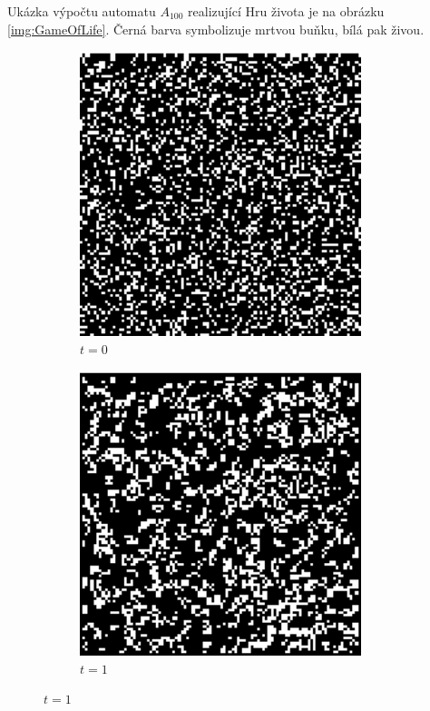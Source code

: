 \documentclass[a4paper,10pt]{article}
\begin{document}
\begin{example}  
  Ukázka výpočtu automatu $A_100$ realizující Hru života je na obrázku \ref{img:GameOfLife}. Černá barva symbolizuje mrtvou buňku, bílá pak živou. 
\end{example}

\begin{figure}[]
 \centering
 \begin{subfigure}{0.4\textwidth} \centering
  \includegraphics[width=0.9\textwidth]{game-of-life-1}
  \caption{$t = 0$}
 \end{subfigure}%
 \begin{subfigure}{0.4\textwidth} \centering
  \includegraphics[width=0.9\textwidth]{game-of-life-2}
  \caption{$t = 1$}
 \end{subfigure}
 

\end{figure}
\end{document}
